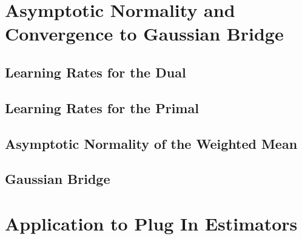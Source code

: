 \documentclass[11pt, a4paper, BCOR=10mm, DIV=11]{scrbook}
\theoremstyle{definition}
\theoremstyle{plain}
\begin{document}
  \section{Asymptotic Normality and Convergence to Gaussian Bridge}
  
  \subsection*{Learning Rates for the Dual}
  
  \subsection*{Learning Rates for the Primal}
  
  \subsection*{Asymptotic Normality of the Weighted Mean}
  
  \subsection*{Gaussian Bridge}
  
  \section{Application to Plug In Estimators}
  
%  
%  
%  
%
%  
\end{document}
